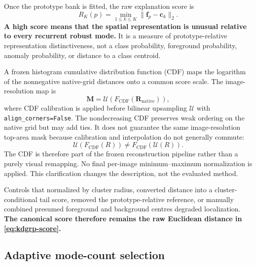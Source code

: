 Once the prototype bank is fitted, the raw explanation score is
\begin{equation}
    \boxed{
    R_K(p)=\min_{1\leq k\leq K}
        \|\bm f_p-\bm c_k\|_2.}
    \label{eq:kdgrp-score}
\end{equation}
\textbf{A high score means that the spatial representation is unusual relative
to every recurrent robust mode.} It is a measure of prototype-relative
representation distinctiveness, not a class probability, foreground
probability, anomaly probability, or distance to a class centroid.

A frozen histogram cumulative distribution function (CDF) maps the logarithm
of the nonnegative native-grid distances onto a common score scale. The
image-resolution map is
\begin{equation}
    \bm M=\mathcal U\!\left(F_{\mathrm{CDF}}
    (\bm R_{\mathrm{native}})\right),
    \label{eq:kdgrp-reconstruction}
\end{equation}
where CDF calibration is applied before bilinear upsampling $\mathcal U$ with
\texttt{align\_corners=False}. The nondecreasing CDF preserves weak ordering on
the native grid but may add ties. It does not guarantee the same
image-resolution top-area mask because calibration and interpolation do not
generally commute:
\begin{equation}
    \mathcal U(F_{\mathrm{CDF}}(R))
    \neq F_{\mathrm{CDF}}(\mathcal U(R)).
\end{equation}
The CDF is therefore part of the frozen reconstruction pipeline rather than a
purely visual remapping. No final per-image minimum--maximum normalization is
applied. This clarification changes the description, not the evaluated method.

Controls that normalized by cluster radius, converted distance into a
cluster-conditional tail score, removed the prototype-relative reference, or
manually combined presumed foreground and background centres degraded
localization. \textbf{The canonical score therefore remains the raw Euclidean
distance in \cref{eq:kdgrp-score}.}

\subsection{Adaptive mode-count selection}

